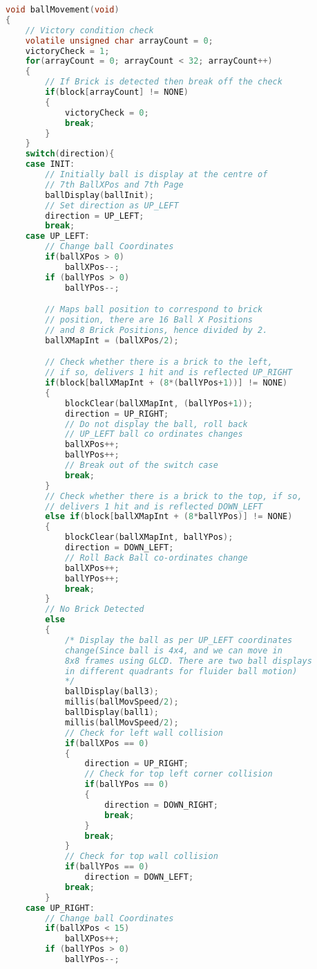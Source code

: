 \documentclass{article}
\begin{document}
      \begin{lstlisting}[basicstyle = \small, language = C]
void ballMovement(void)
{
    // Victory condition check
    volatile unsigned char arrayCount = 0;
    victoryCheck = 1;
    for(arrayCount = 0; arrayCount < 32; arrayCount++)
    {
        // If Brick is detected then break off the check
        if(block[arrayCount] != NONE)
        {
            victoryCheck = 0;
            break;
        }
    }
    switch(direction){
    case INIT:
        // Initially ball is display at the centre of 
        // 7th BallXPos and 7th Page
        ballDisplay(ballInit);
        // Set direction as UP_LEFT
        direction = UP_LEFT;
        break;
    case UP_LEFT:
        // Change ball Coordinates
        if(ballXPos > 0)
            ballXPos--;
        if (ballYPos > 0)
            ballYPos--;

        // Maps ball position to correspond to brick 
        // position, there are 16 Ball X Positions
        // and 8 Brick Positions, hence divided by 2.
        ballXMapInt = (ballXPos/2);

        // Check whether there is a brick to the left, 
        // if so, delivers 1 hit and is reflected UP_RIGHT
        if(block[ballXMapInt + (8*(ballYPos+1))] != NONE)
        {
            blockClear(ballXMapInt, (ballYPos+1));
            direction = UP_RIGHT;
            // Do not display the ball, roll back 
            // UP_LEFT ball co ordinates changes
            ballXPos++;
            ballYPos++;
            // Break out of the switch case
            break;
        }
        // Check whether there is a brick to the top, if so, 
        // delivers 1 hit and is reflected DOWN_LEFT
        else if(block[ballXMapInt + (8*ballYPos)] != NONE)
        {
            blockClear(ballXMapInt, ballYPos);
            direction = DOWN_LEFT;
            // Roll Back Ball co-ordinates change
            ballXPos++;
            ballYPos++;
            break;
        }
        // No Brick Detected
        else
        {
            /* Display the ball as per UP_LEFT coordinates 
            change(Since ball is 4x4, and we can move in 
            8x8 frames using GLCD. There are two ball displays 
            in different quadrants for fluider ball motion)
            */
            ballDisplay(ball3);
            millis(ballMovSpeed/2);
            ballDisplay(ball1);
            millis(ballMovSpeed/2);
            // Check for left wall collision
            if(ballXPos == 0)
            {
                direction = UP_RIGHT;
                // Check for top left corner collision
                if(ballYPos == 0)
                {
                    direction = DOWN_RIGHT;
                    break;
                }
                break;
            }
            // Check for top wall collision
            if(ballYPos == 0)
                direction = DOWN_LEFT;
            break;
        }
    case UP_RIGHT:
        // Change ball Coordinates
        if(ballXPos < 15)
            ballXPos++;
        if (ballYPos > 0)
            ballYPos--;


\end{lstlisting}
\end{document}
